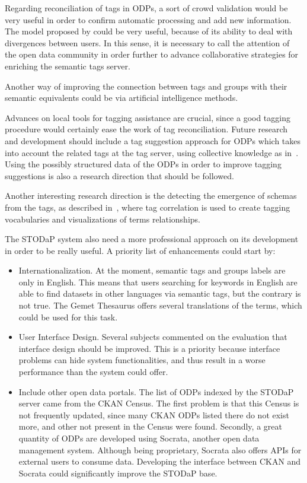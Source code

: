 Regarding reconciliation of tags in ODPs, a sort of crowd validation would be very useful in order to confirm automatic processing and add new information.
The model proposed by  could be very useful, because of its ability to deal with divergences between users.
In this sense, it is necessary to call the attention of the open data community in order further to advance collaborative strategies for enriching the semantic tags server.

Another way of improving the connection between tags and groups with their semantic equivalents could be via artificial intelligence methods. 

Advances on local tools for tagging assistance are crucial, since a good tagging procedure would certainly ease the work of tag reconciliation. 
Future research and development should include a tag suggestion approach for ODPs which takes into account the related tags at the tag server, using collective knowledge as in~.
Using the possibly structured data of the ODPs in order to improve tagging suggestions is also a research direction that should be followed.

Another interesting research direction is the detecting the emergence of schemas from the tags, as described in~, where tag correlation is used to create tagging vocabularies and visualizations of terms relationships.

The STODaP system also need a more professional approach on its development in order to be really useful. A priority list of enhancements could start by: 

\begin{itemize}
	\item Internationalization. At the moment, semantic tags and groups labels are only in English. This means that users searching for keywords in English are able to find datasets in other languages via semantic tags, but the contrary is not true. The Gemet Thesaurus offers several translations of the terms, which could be used for this task.
	\item User Interface Design. Several subjects commented on the evaluation that interface design should be improved. This is a priority because interface problems can hide system functionalities, and thus result in a worse performance than the system could offer.
	\item Include other open data portals. The list of ODPs indexed by the STODaP server came from the CKAN Census. The first problem is that this Census is not frequently updated, since many CKAN ODPs listed there do not exist more, and other not present in the Census were found. Secondly, a great quantity of ODPs are developed using Socrata, another open data management system. Although being proprietary, Socrata also offers APIs for external users to consume data. Developing the interface between CKAN and Socrata could significantly improve the STODaP base.
\end{itemize}

